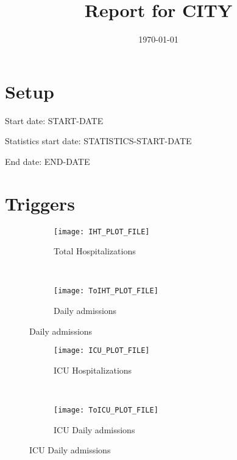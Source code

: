 \documentclass{article}
\title{Report for CITY}
\author{}
\date{\today}
\begin{document}
\maketitle

\section*{Setup}

Start date: START-DATE

Statistics start date: STATISTICS-START-DATE

End date: END-DATE 




\section*{Triggers}
\begin{figure}[!htb]
  \centering
  \setlength{\unitlength}{1cm}
    \begin{subfigure}[b]{0.475\linewidth}
    \centering
        \texttt{[image: IHT\_PLOT\_FILE]}
        \caption{Total Hospitalizations}
        \label{fig:IHT}
    \end{subfigure}
    ~
    \begin{subfigure}[b]{0.475\linewidth}
    \centering
         \texttt{[image: ToIHT\_PLOT\_FILE]}
        \caption{Daily admissions}
        \label{fig:ToIHT}
    \end{subfigure}
\end{figure}
\vspace{1cm}
\begin{figure}[!htb]
	\centering
	\setlength{\unitlength}{1cm}
	\begin{subfigure}[b]{0.475\linewidth}
		\centering
		\texttt{[image: ICU\_PLOT\_FILE]}
		\caption{ICU Hospitalizations}
		\label{fig:ICU}
	\end{subfigure}
	~
	\begin{subfigure}[b]{0.475\linewidth}
		\centering
		\texttt{[image: ToICU\_PLOT\_FILE]}
		\caption{ICU Daily admissions}
		\label{fig:ToICU}
	\end{subfigure}
\end{figure}
\end{document}
